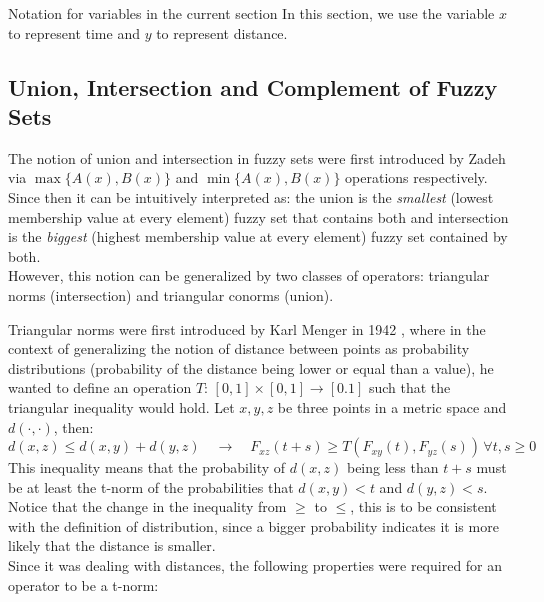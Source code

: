\begin{notation}[label={not:OpsFS}]{Notation for variables in the current section}
    In this section, we use the variable \( x \) to represent time and \( y \) to represent distance.
  \end{notation}

\subsection{Union, Intersection and Complement of Fuzzy Sets}
The notion of union and intersection in fuzzy sets were first introduced by Zadeh \cite{Zadeh1965} via $\max\{A(x),B(x)\}$ and $\min\{A(x),B(x)\}$ operations respectively. Since then it can be intuitively interpreted as: the union is the \textit{smallest} (lowest membership value at every element) fuzzy set that contains both and intersection is the \textit{biggest} (highest membership value at every element) fuzzy set contained by both.\\

However, this notion can be generalized by two classes of operators: triangular norms (intersection) and triangular conorms (union). 

Triangular norms were first introduced by Karl Menger in 1942 \cite{OriginTNorms}, where in the context of generalizing the notion of distance between points as probability distributions (probability of the distance being lower or equal than a value), he wanted to define an operation $T:\,[0,1]\times [0,1]\to [0.1]$ such that the triangular inequality would hold. Let $x,y,z$ be three points in a metric space and $d(\cdot,\cdot)$, then:
\[
  d(x, z) \leq d(x, y) + d(y, z)\quad \longrightarrow \quad F_{xz}(t + s) \geq T(F_{xy}(t), F_{yz}(s))\,\forall t,s\geq 0
\]
This inequality means that the probability of $d(x,z)$ being less than $t+s$ must be at least the t-norm of the probabilities that $d(x,y)<t$ and $d(y,z)<s$. Notice that the change in the inequality from $\geq$ to $\leq$, this is to be consistent with the definition of distribution, since a bigger probability indicates it is more likely that the distance is smaller.\\

Since it was dealing with distances, the following properties were required for an operator to be a t-norm:

